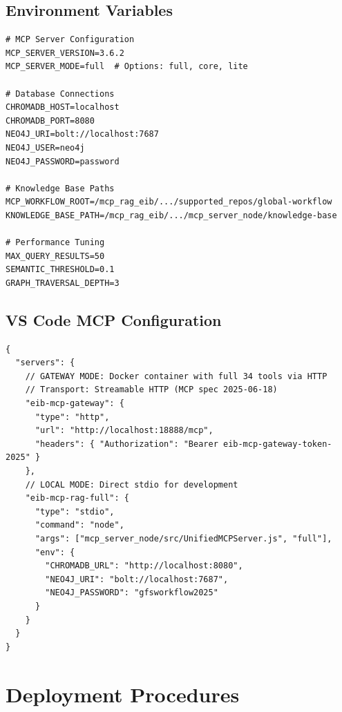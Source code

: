 \documentclass[11pt,letterpaper,twoside]{article}
\begin{document}
\subsection{Environment Variables}

\begin{lstlisting}[style=bashstyle, basicstyle=\ttfamily\footnotesize, caption={mcp-config.env — Primary configuration file}]
# MCP Server Configuration
MCP_SERVER_VERSION=3.6.2
MCP_SERVER_MODE=full  # Options: full, core, lite

# Database Connections
CHROMADB_HOST=localhost
CHROMADB_PORT=8080
NEO4J_URI=bolt://localhost:7687
NEO4J_USER=neo4j
NEO4J_PASSWORD=password

# Knowledge Base Paths
MCP_WORKFLOW_ROOT=/mcp_rag_eib/.../supported_repos/global-workflow
KNOWLEDGE_BASE_PATH=/mcp_rag_eib/.../mcp_server_node/knowledge-base

# Performance Tuning
MAX_QUERY_RESULTS=50
SEMANTIC_THRESHOLD=0.1
GRAPH_TRAVERSAL_DEPTH=3
\end{lstlisting}

\vspace{1.5em}
\subsection{VS Code MCP Configuration}

\begin{lstlisting}[style=jsonstyle, basicstyle=\ttfamily\footnotesize, caption={.vscode/mcp.json — Docker MCP Gateway integration}]
{
  "servers": {
    // GATEWAY MODE: Docker container with full 34 tools via HTTP
    // Transport: Streamable HTTP (MCP spec 2025-06-18)
    "eib-mcp-gateway": {
      "type": "http",
      "url": "http://localhost:18888/mcp",
      "headers": { "Authorization": "Bearer eib-mcp-gateway-token-2025" }
    },
    // LOCAL MODE: Direct stdio for development
    "eib-mcp-rag-full": {
      "type": "stdio",
      "command": "node",
      "args": ["mcp_server_node/src/UnifiedMCPServer.js", "full"],
      "env": {
        "CHROMADB_URL": "http://localhost:8080",
        "NEO4J_URI": "bolt://localhost:7687",
        "NEO4J_PASSWORD": "gfsworkflow2025"
      }
    }
  }
}
\end{lstlisting}

\newpage
\section{Deployment Procedures}
\end{document}
